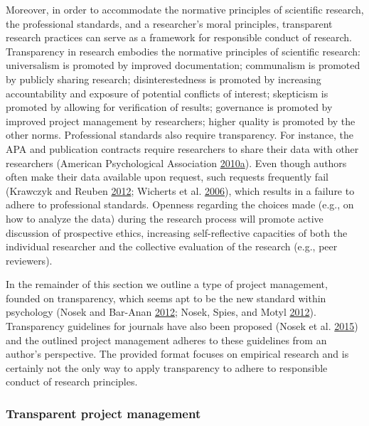 \documentclass[a5paper]{book}
\begin{document}
Moreover, in order to accommodate the normative principles of scientific
research, the professional standards, and a researcher's moral
principles, transparent research practices can serve as a framework for
responsible conduct of research. Transparency in research embodies the
normative principles of scientific research: universalism is promoted by
improved documentation; communalism is promoted by publicly sharing
research; disinterestedness is promoted by increasing accountability and
exposure of potential conflicts of interest; skepticism is promoted by
allowing for verification of results; governance is promoted by improved
project management by researchers; higher quality is promoted by the
other norms. Professional standards also require transparency. For
instance, the APA and publication contracts require researchers to share
their data with other researchers (American Psychological Association
\protect\hyperlink{ref-apa2010}{2010}\protect\hyperlink{ref-apa2010}{a}).
Even though authors often make their data available upon request, such
requests frequently fail (Krawczyk and Reuben
\protect\hyperlink{ref-doi:10.1080ux2f08989621.2012.678688}{2012};
Wicherts et al.
\protect\hyperlink{ref-doi:10.1037ux2f0003-066x.61.7.726}{2006}), which
results in a failure to adhere to professional standards. Openness
regarding the choices made (e.g., on how to analyze the data) during the
research process will promote active discussion of prospective ethics,
increasing self-reflective capacities of both the individual researcher
and the collective evaluation of the research (e.g., peer reviewers).

In the remainder of this section we outline a type of project
management, founded on transparency, which seems apt to be the new
standard within psychology (Nosek and Bar-Anan
\protect\hyperlink{ref-doi:10.1080ux2f1047840X.2012.692215}{2012};
Nosek, Spies, and Motyl
\protect\hyperlink{ref-doi:10.1177ux2f1745691612459058}{2012}).
Transparency guidelines for journals have also been proposed (Nosek et
al. \protect\hyperlink{ref-doi:10.1126ux2fscience.aab2374}{2015}) and
the outlined project management adheres to these guidelines from an
author's perspective. The provided format focuses on empirical research
and is certainly not the only way to apply transparency to adhere to
responsible conduct of research principles.

\subsubsection{Transparent project
management}\label{transparent-project-management}
\end{document}
